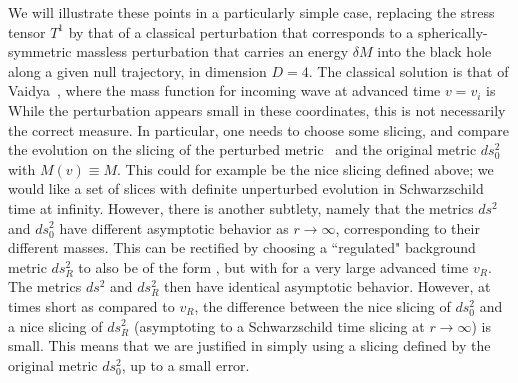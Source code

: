 We will illustrate these points in a particularly simple case, replacing the stress tensor $T^1$ by that of a classical perturbation that corresponds to a spherically-symmetric massless perturbation that carries an energy $\delta M$ into the black hole along a given null trajectory, in dimension $D=4$.  The classical solution is that of Vaidya~,
%
\eqn{}
%
where the mass function for incoming wave at advanced time $v=v_i$ is
%
\eqn{}
%
While the perturbation appears small in these coordinates, this is not necessarily the correct measure.  In particular, one needs to choose some slicing, and compare the evolution on the slicing of the perturbed metric \vsoln\ and the original metric $ds_0^2$ with $M(v)\equiv M$.  This could for example be the nice slicing defined above; we would like a set of slices with definite unperturbed evolution in Schwarzschild time at infinity.  However, there is another subtlety, namely that the metrics $ds^2$ and $ds_0^2$ have different asymptotic behavior as $r\rightarrow\infty$, corresponding to their different masses.  This can be rectified by choosing a ``regulated" background metric $ds_R^2$ to also be of the form \vsoln, but with 
%
\eqn{}
%
for a very large  advanced time $v_R$.  The metrics $ds^2$ and $ds_R^2$ then have identical asymptotic behavior.  However, at times short as compared to $v_R$, the difference between the nice slicing of $ds_0^2$ and a nice slicing of $ds_R^2$ (asymptoting to a Schwarzschild time slicing at $r\rightarrow\infty$)  is small.  This means that we are justified in simply using a slicing defined by the original metric $ds_0^2$, up to a small error.

